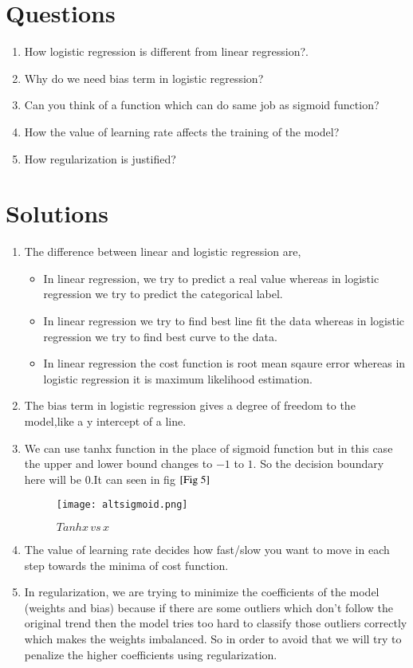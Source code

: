 \documentclass[journal,12pt,onecolumn]{IEEEtran}
\theoremstyle{remark}
\numberwithin{equation}{section}
\begin{document}
		\section{Questions}
		\begin{enumerate}
			\item How logistic regression is different from linear regression?.
			\item Why do we need bias term in logistic regression?
			\item Can you think of a function which can do same job as sigmoid function?
			\item How the value of learning rate affects the training of the model?
			\item How regularization is justified?
		\end{enumerate}
		\section{Solutions}
		 \begin{enumerate}
		        \item The difference between linear and logistic regression are,
			  \begin{itemize}
			   \item In linear regression, we try to predict a real value whereas in logistic regression we try to predict the categorical label.
			   \item In linear regression we try to find best line fit the data whereas in logistic regression we try to find best curve to the data.
		           \item In linear regression the cost function is root mean sqaure error whereas in logistic regression it is maximum likelihood estimation.
		          \end{itemize}
		        \item The bias term in logistic regression gives a degree of freedom to the model,like a y intercept of a line.
		        \item We can use tanhx function in the place of sigmoid function but in this case the upper and lower bound changes to $-1$ to $1$. So the decision boundary here will be $0$.It can seen in fig $\ref{Fig 5}$
			 \begin{figure}
			  \centering
			  \texttt{[image: altsigmoid.png]}
			  \caption{$Tanhx \, vs \,x$}
			  \label{Fig 5}
		         \end{figure}
			\item The value of learning rate decides how fast/slow you want to move in each step towards the minima of cost function.
		        \item In regularization, we are trying to minimize the coefficients of the model (weights and bias) because if there are some outliers which don't follow the original trend then the model tries too hard to classify those outliers correctly which makes the weights imbalanced. So in order to avoid that we will try to penalize the higher coefficients using regularization. 
     \end{enumerate}
	
\end{document}
